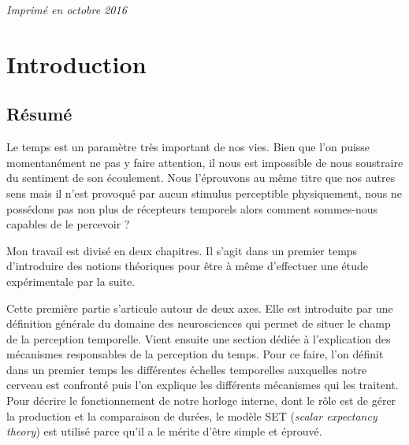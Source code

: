\documentclass[12pt,fleqn,oneside,french,openany]{book} %
\begin{document}
\noindent \textit{Imprimé en octobre 2016}



\pagestyle{empty} %

\tableofcontents %


\pagestyle{fancy} %



\chapter{Introduction} \label{cha:introduction}

\section*{Résumé}
Le temps est un paramètre très important de nos vies. Bien que l'on puisse momentanément ne pas y faire attention, il nous est impossible de nous soustraire du sentiment de son écoulement. Nous l'éprouvons au même titre que nos autres sens mais il n'est provoqué par aucun stimulus perceptible physiquement, nous ne possédons pas non plus de récepteurs temporels alors comment sommes-nous capables de le percevoir ?

Mon travail est divisé en deux chapitres. Il s'agit dans un premier temps d'introduire des notions théoriques pour être à même d'effectuer une étude expérimentale par la suite. 

Cette première partie s'articule autour de deux axes. Elle est introduite par une définition générale du domaine des neurosciences qui permet de situer le champ de la perception temporelle. Vient ensuite une section dédiée à l'explication des mécanismes responsables de la perception du temps. Pour ce faire, l'on définit dans un premier temps les différentes échelles temporelles auxquelles notre cerveau est confronté puis l'on explique les différents mécanismes qui les traitent. Pour décrire le fonctionnement de notre horloge interne, dont le rôle est de gérer la production et la comparaison de durées, le modèle SET (\emph{scalar expectancy theory}) est utilisé parce qu'il a le mérite d'être simple et éprouvé.
\end{document}
